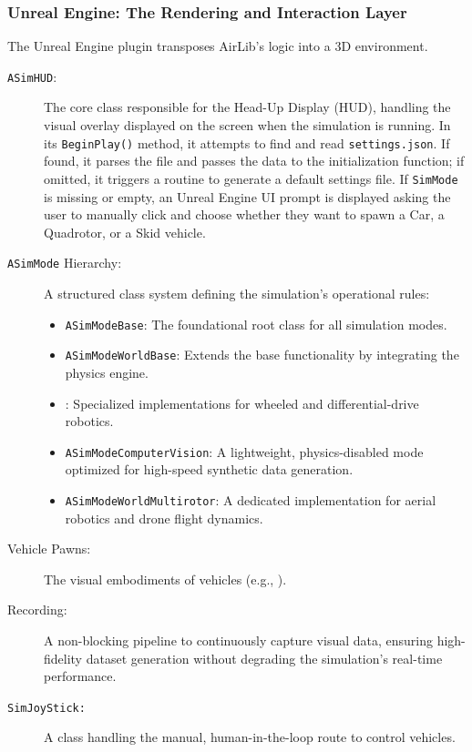 \subsubsection{Unreal Engine: The Rendering and Interaction Layer}
\noindent
The Unreal Engine plugin transposes AirLib's logic into a 3D environment.
\begin{description}
    \item[\texttt{ASimHUD}:]  The core class responsible for the Head-Up Display (HUD), handling the visual overlay displayed on the screen when the simulation is running. In its \texttt{BeginPlay()} method, it attempts to find and read \texttt{settings.json}. If found, it parses the file and passes the data to the initialization function; if omitted, it triggers a routine to generate a default settings file. If \texttt{SimMode} is missing or empty, an Unreal Engine UI prompt is displayed asking the user to manually click and choose whether they want to spawn a Car, a Quadrotor, or a Skid vehicle.
    \item[\texttt{ASimMode} Hierarchy:] A structured class system defining the simulation's operational rules:
    \begin{itemize}
        \item \texttt{ASimModeBase}: The foundational root class for all simulation modes.
        \item \texttt{ASimModeWorldBase}: Extends the base functionality by integrating the physics engine.
        \item \texttt{}: Specialized implementations for wheeled and differential-drive robotics.
        \item \texttt{ASimModeComputerVision}: A lightweight, physics-disabled mode optimized for high-speed synthetic data generation.
        \item \texttt{ASimModeWorldMultirotor}: A dedicated implementation for aerial robotics and drone flight dynamics.
    \end{itemize}
    \item[Vehicle Pawns:] The visual embodiments of vehicles (e.g., \texttt{}). 
    \item[Recording:] A non-blocking pipeline to continuously capture visual data, ensuring high-fidelity dataset generation without degrading the simulation's real-time performance.
    \item[\texttt{SimJoyStick:}] A class handling the manual, human-in-the-loop route to control vehicles.
\end{description}
